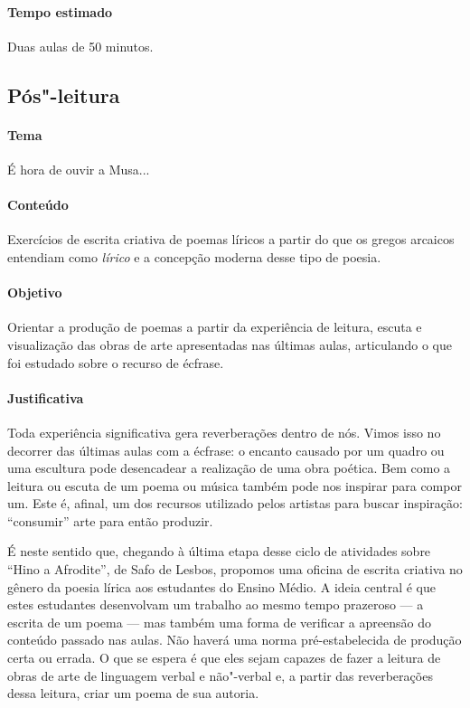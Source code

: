 \documentclass[12pt]{extarticle}
\begin{document}
\paragraph{Tempo estimado} Duas aulas de 50 minutos.

\subsection{Pós"-leitura}

\paragraph{Tema} É hora de ouvir a Musa...  

\paragraph{Conteúdo} Exercícios de escrita criativa de poemas líricos a partir
do que os gregos arcaicos entendiam como \emph{lírico} e a concepção moderna
desse tipo de poesia. 

\paragraph{Objetivo} Orientar a produção de poemas a partir da experiência
de leitura, escuta e visualização das obras de arte apresentadas nas últimas
aulas, articulando o que foi estudado sobre o recurso de écfrase.

\paragraph{Justificativa} Toda experiência significativa gera reverberações
dentro de nós. Vimos isso no decorrer das últimas aulas com a écfrase: o 
encanto causado por um quadro ou uma escultura pode desencadear a realização
de uma obra poética. Bem como a leitura ou escuta de um poema ou música 
também pode nos inspirar para compor um. Este é, afinal, um dos recursos
utilizado pelos artistas para buscar inspiração: ``consumir'' arte para
então produzir. 

É neste sentido que, chegando à última etapa desse ciclo de atividades sobre
``Hino a Afrodite'', de Safo de Lesbos, propomos uma oficina de escrita criativa
no gênero da poesia lírica aos estudantes do Ensino Médio. A ideia central
é que estes estudantes desenvolvam um trabalho ao mesmo tempo prazeroso ---
a escrita de um poema --- mas também uma forma de verificar a apreensão do
conteúdo passado nas aulas. Não haverá uma norma pré-estabelecida de
produção certa ou errada. O que se espera é que eles sejam capazes de fazer
a leitura de obras de arte de linguagem verbal e não"-verbal e, a partir
das reverberações dessa leitura, criar um poema de sua autoria. 
\end{document}
